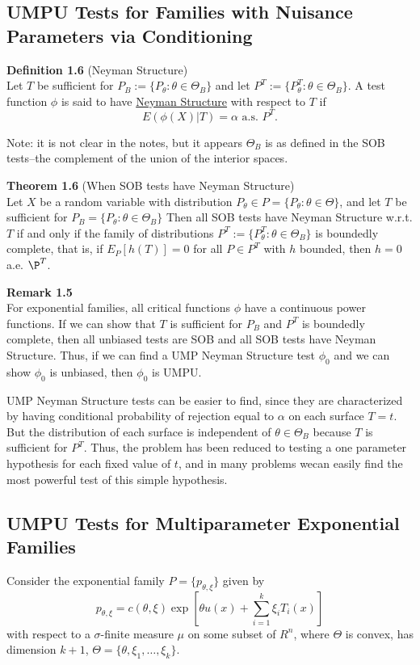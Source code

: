 \documentclass[12pt]{article}
\numberwithin{equation}{section}
\begin{document}
\subsection{UMPU Tests for Families with Nuisance Parameters via Conditioning}
\textbf{Definition 1.6} (Neyman Structure) \\
Let $T$ be sufficient for $P_B := \{P_{\theta} : \theta \in \Theta_B \}$ and let $P^T := \{ P_{\theta}^T : \theta \in \Theta_B \}$. A test function $\phi$ is said to have \underline{Neyman Structure} with respect to $T$ if
\begin{equation*}
  E(\phi(X) | T) = \alpha \text{ a.s. }P^T. 
\end{equation*}

Note: it is not clear in the notes, but it appears $\Theta_B$ is as defined in the SOB tests--the complement of the union of the interior spaces.

\textbf{Theorem 1.6} (When SOB tests have Neyman Structure) \\
Let $X$ be a random variable with distribution $P_{\theta} \in P =
\{ P_{\theta} : \theta \in \Theta \}$, and let $T$ be sufficient for
$P_{B} = \{ P_{\theta} : \theta \in \Theta_B \}$ Then all SOB tests have Neyman Structure w.r.t. $T$ if and only if the family of distributions 
$P^T := \{ P_{\theta}^T : \theta \in \Theta_B \}$ is boundedly complete, that is, if $E_P[h(T)] = 0$ for all $P \in P^T$ with $h$ bounded, then $h = 0$ a.e. $\P^T$. 

\textbf{Remark 1.5} \\
For exponential families, all critical functions $\phi$ have a continuous power functions. If we can show that $T$ is sufficient for $P_B$ and $P^T$ is boundedly complete, then all unbiased tests are SOB and all SOB tests have Neyman Structure. Thus, if we can find a UMP Neyman Structure test $\phi_0$ and we can show $\phi_0$ is unbiased, then $\phi_0$ is UMPU.

UMP Neyman Structure tests can be easier to find, since they are characterized by having conditional probability of rejection equal to $\alpha$ on each surface $T = t$. But the distribution of each surface is independent of $\theta \in \Theta_B$ because $T$ is sufficient for $P^T$. Thus, the problem has been reduced to testing a one parameter hypothesis for each fixed value of $t$, and in many problems wecan easily find the most powerful test of this simple hypothesis. 


\subsection{UMPU Tests for Multiparameter Exponential Families}
Consider the exponential family $P = \{p_{\theta, \xi} \}$ given by
\begin{equation*}
  p_{\theta, \xi} = c(\theta, \xi) \exp\left[
    \theta u(x) + \sum_{i=1}^k \xi_i T_i(x)
  \right]
\end{equation*}
with respect to a $\sigma$-finite measure $\mu$ on some subset of $R^n$, where $\Theta$ is convex, has dimension $k+1$, $\Theta = \{\theta, \xi_1, \ldots, \xi_k\}$. 
\end{document}
